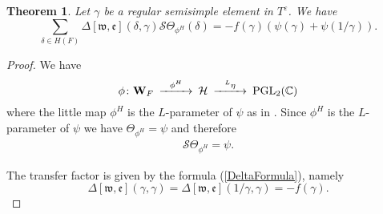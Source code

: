 \documentclass[11pt]{amsart}
\numberwithin{equation}{section}
\newtheorem{thm}[equation]{Theorem}
\def\fe{\mathfrak{e}}
\def\fw{\mathfrak{w}}
\def\Gal{\mathrm{Gal}}
\def\PGL{\mathrm{PGL}}
\def\bW{\mathbf{W}}
\def\C{\mathbb{C}}
\def\W{\mathbf{W}}
\newcommand{\<}{\left\langle}
\renewcommand{\>}{\right\rangle}
\begin{document}
 
 \begin{thm}\label{ENDO}  Let $\gamma$ be a regular semisimple element in $T^\varepsilon$.      We have 
  \[
 \sum_{\delta \in H(F)}  \Delta[\fw, \fe](\delta, \gamma) \mathscr{S}\Theta_{\phi^H} (\delta) = 
 - f(\gamma)( \psi(\gamma) + \psi(1/ \gamma)) .
  \]
    \end{thm}
  \begin{proof} 
We have
\[
  \begin{CD}
 \phi \colon  \bW_F @> \phi^H >> \mathcal{H}    @>  {}^L\eta >> \PGL_2(\C)
  \end{CD}
  \]
  where the little map   $\phi^H$ is the $L$-parameter of $\psi$ as in \cite[p.1148]{Ka2}.    
    Since $\phi^H$ is the $L$-parameter of $\psi$ we have 
  $\Theta_{\phi^H} = \psi$ and therefore 
   \begin{eqnarray}\label{SS}
    \mathscr{S}\Theta_{\phi^H} = \psi.
  \end{eqnarray}

 
   The transfer factor   is given by the formula (\ref{DeltaFormula}), namely
   \begin{equation}\label{DeltaFormula2}
   \Delta[\fw, \fe](\gamma,\gamma ) = \Delta[\fw, \fe](1/\gamma, \gamma) = - f(\gamma).
   \end{equation}
   


\end{proof}
\end{document}
